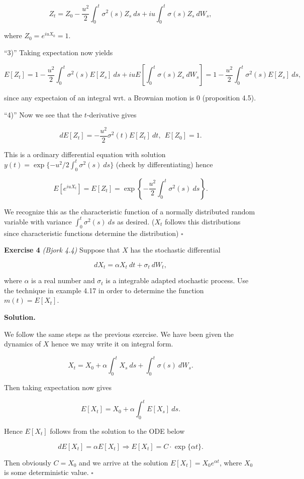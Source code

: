 \documentclass[a4paper,12pt,openany]{book}
\begin{document}
\[
Z_t=Z_0-\frac{u^2}{2}\int_0^t\sigma^2(s)Z_s\ ds+iu\int_0^t\sigma (s)Z_s\ dW_s,
\]

where \(Z_0=e^{iuX_0}=1\).

``3)'' Taking expectation now yields

\[
E[Z_t]=1-\frac{u^2}{2}\int_0^t\sigma^2(s)E[Z_s]\ ds+iuE\left[\int_0^t \sigma(s)Z_s\ dW_s\right]=1-\frac{u^2}{2}\int_0^t\sigma^2(s)E[Z_s]\ ds,
\]

since any expectaion of an integral wrt. a Brownian motion is 0 (proposition 4.5).

``4)'' Now we see that the \(t\)-derivative gives

\[
dE[Z_t]=-\frac{u^2}{2}\sigma^2(t)E[Z_t]\ dt,\ \ E[Z_0]=1.
\]

This is a ordinary differential equation with solution \(y(t)=\exp\{-u^2/2\int_0^t\sigma^2(s)\ ds\}\) (check by differentiating) hence

\[
E[e^{iuX_t}]=E[Z_t]=\exp\left\{-\frac{u^2}{2}\int_0^t\sigma^2(s)\ ds\right\}.
\]

We recognize this as the characteristic function of a normally distributed random variable with variance \(\int_0^t\sigma^2(s)\ ds\) as desired. (\(X_t\) follows this distributions since characteristic functions determine the distribution) \(\square\)

\textbf{Exercise 4} \emph{(Bjork 4.4)} Suppose that \(X\) has the stochastic differential

\[
dX_t=\alpha X_t\ dt+\sigma_t\ dW_t,
\]

where \(\alpha\) is a real number and \(\sigma_t\) is a integrable adapted stochastic process. Use the technique in example 4.17 in order to determine the function \(m(t)=E[X_t]\).

\textbf{Solution.}

We follow the same steps as the previous exercise. We have been given the dynamics of \(X\) hence we may write it on integral form.

\[
X_t=X_0+\alpha\int_0^tX_s\ ds+\int_0^t\sigma(s)\ dW_s.
\]

Then taking expectation now gives

\[
E[X_t]=X_0+\alpha\int_0^tE[X_s]\ ds.
\]

Hence \(E[X_t]\) follows from the solution to the ODE below

\[
dE[X_t]=\alpha E[X_t]\Rightarrow E[X_t]=C\cdot\exp\{\alpha t\}.
\]

Then obviously \(C=X_0\) and we arrive at the solution \(E[X_t]=X_0e^{\alpha t}\), where \(X_0\) is some deterministic value. \(\square\)
\end{document}
